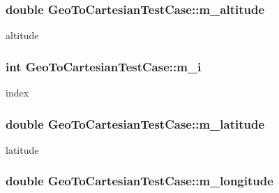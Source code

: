 \subsubsection[{\texorpdfstring{m\+\_\+altitude}{m_altitude}}]{\setlength{\rightskip}{0pt plus 5cm}double Geo\+To\+Cartesian\+Test\+Case\+::m\+\_\+altitude\hspace{0.3cm}{\ttfamily [private]}}\hypertarget{classGeoToCartesianTestCase_a786ef59877cc3d553ca359d7ddfcaa21}{}\label{classGeoToCartesianTestCase_a786ef59877cc3d553ca359d7ddfcaa21}


altitude 

\subsubsection[{\texorpdfstring{m\+\_\+i}{m_i}}]{\setlength{\rightskip}{0pt plus 5cm}int Geo\+To\+Cartesian\+Test\+Case\+::m\+\_\+i\hspace{0.3cm}{\ttfamily [private]}}\hypertarget{classGeoToCartesianTestCase_aeeb6a9cb21dad88d5ea4d939bf444f95}{}\label{classGeoToCartesianTestCase_aeeb6a9cb21dad88d5ea4d939bf444f95}


index 

\subsubsection[{\texorpdfstring{m\+\_\+latitude}{m_latitude}}]{\setlength{\rightskip}{0pt plus 5cm}double Geo\+To\+Cartesian\+Test\+Case\+::m\+\_\+latitude\hspace{0.3cm}{\ttfamily [private]}}\hypertarget{classGeoToCartesianTestCase_a9902e23dd6ffe03e801cd1be758d978d}{}\label{classGeoToCartesianTestCase_a9902e23dd6ffe03e801cd1be758d978d}


latitude 

\subsubsection[{\texorpdfstring{m\+\_\+longitude}{m_longitude}}]{\setlength{\rightskip}{0pt plus 5cm}double Geo\+To\+Cartesian\+Test\+Case\+::m\+\_\+longitude\hspace{0.3cm}{\ttfamily [private]}}\hypertarget{classGeoToCartesianTestCase_a0b934f42b5af86efff9ad42f01e2e949}{}\label{classGeoToCartesianTestCase_a0b934f42b5af86efff9ad42f01e2e949}



